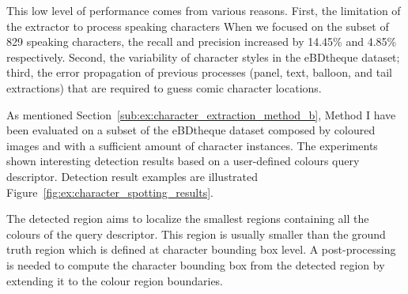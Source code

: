 This low level of performance comes from various reasons.
First, the limitation of the extractor to process speaking characters
When we focused on the subset of 829 speaking characters, the recall and precision increased by 14.45\% and 4.85\% respectively.
Second, the variability of character styles in the eBDtheque dataset; third, the error propagation of previous processes (panel, text, balloon, and tail extractions) that are required to guess comic character locations.





As mentioned Section~\ref{sub:ex:character_extraction_method_b}, Method I have been evaluated on a subset of the eBDtheque dataset composed by coloured images and with a sufficient amount of character instances.
The experiments shown interesting detection results based on a user-defined colours query descriptor.
Detection result examples are illustrated Figure~\ref{fig:ex:character_spotting_results}.

The detected region aims to localize the smallest regions containing all the colours of the query descriptor.
This region is usually smaller than the ground truth region which is defined at character bounding box level.
A post-processing is needed to compute the character bounding box from the detected region by extending it to the colour region boundaries.

